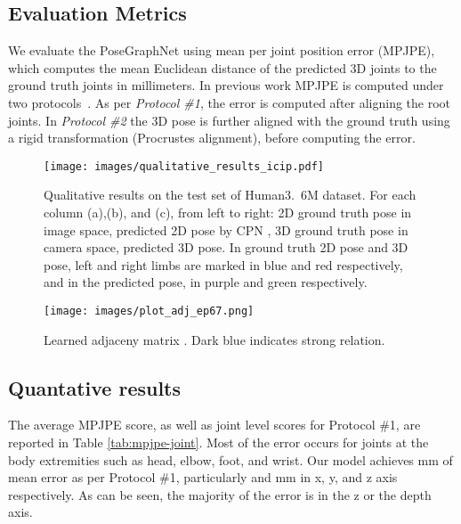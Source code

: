 \documentclass{article}
\begin{document}
\subsection{Evaluation Metrics}
We evaluate the PoseGraphNet using mean per joint position error (MPJPE), which computes the mean Euclidean distance of the predicted 3D joints to the ground truth joints in millimeters.
In previous work MPJPE is computed under two protocols~\cite{Martinez2017,Cai2019,Zhao2019}.
As per \textit{Protocol \#1}, the error is computed after aligning the root joints. 
In \textit{Protocol \#2} the 3D pose is further aligned with the ground truth using a rigid transformation (Procrustes alignment), before computing the error.

\begin{figure*}[t]
\begin{center}
\texttt{[image: images/qualitative\_results\_icip.pdf]}
\end{center}
   \caption{Qualitative results on the test set of Human3.~6M dataset. For each column (a),(b), and (c), from left to right: 2D ground truth pose in image space, predicted 2D pose by CPN \cite{Chen2018}, 3D ground truth pose in camera space, predicted 3D pose. In ground truth 2D pose and 3D pose, left and right limbs are marked in blue and red respectively, and in the predicted pose, in purple and green respectively.}   
\label{fig:sample_results}
\end{figure*}

\begin{figure}[t]
\begin{center}
\texttt{[image: images/plot\_adj\_ep67.png]}
\end{center}
   \caption{Learned adjaceny matrix . Dark blue indicates strong relation.}   
\label{fig:adj}
\end{figure}

\subsection{Quantative results}
The average MPJPE score, as well as joint level scores for Protocol \#1, are reported in Table \ref{tab:mpjpe-joint}. 
Most of the error occurs for joints at the body extremities such as head, elbow, foot, and wrist. 
Our model achieves  mm of mean error as per Protocol \#1, particularly  and  mm in x, y, and z axis respectively. 
As can be seen, the majority of the error is in the z or the depth axis.
\end{document}

